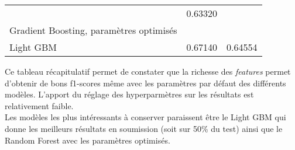 \documentclass[11pt]{article}
\begin{document}
\begin{longtable}[]{@{}lll@{}}
\begin{minipage}[t]{0.26\columnwidth}
\end{minipage} & \begin{minipage}[t]{0.32\columnwidth}\raggedright\strut
0.63320\strut
\end{minipage}\tabularnewline
\begin{minipage}[t]{0.32\columnwidth}\raggedright\strut
Gradient Boosting, paramètres optimisés\strut
\end{minipage} & \begin{minipage}[t]{0.26\columnwidth}\raggedright\strut
\strut
\end{minipage} & \begin{minipage}[t]{0.32\columnwidth}\raggedright\strut
\strut
\end{minipage}\tabularnewline
\begin{minipage}[t]{0.32\columnwidth}\raggedright\strut
Light GBM\strut
\end{minipage} & \begin{minipage}[t]{0.26\columnwidth}\raggedright\strut
0.67140\strut
\end{minipage} & \begin{minipage}[t]{0.32\columnwidth}\raggedright\strut
0.64554\strut
\end{minipage}\tabularnewline
\bottomrule
\end{longtable}

Ce tableau récapitulatif permet de constater que la richesse des
\emph{features} permet d'obtenir de bons f1-scores même avec les
paramètres par défaut des différents modèles. L'apport du réglage des
hyperparmètres sur les résultats est relativement faible.\\
Les modèles les plus intéressants à conserver paraissent être le Light
GBM qui donne les meilleurs résultats en soumission (soit sur 50\% du
test) ainsi que le Random Forest avec les paramètres optimisés.


    
    
    
    
\end{document}
